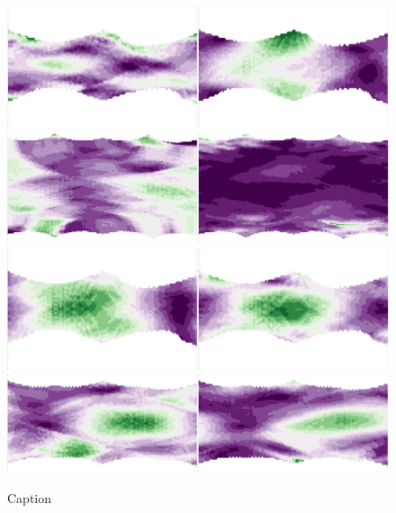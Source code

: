\begin{figure}
    \centering
    \includegraphics[width=\columnwidth]{images/RadonPlots/RT-snips/RPSB-9872-3701-RT-snip.png}
    \includegraphics[width=\columnwidth]{images/RadonPlots/RT-snips/RPSB-8932-12704-RT-snip.png}
    \includegraphics[width=\columnwidth]{images/RadonPlots/RT-snips/RPSB-8554-3701-RT-snip.png}
    \includegraphics[width=\columnwidth]{images/RadonPlots/RT-snips/RPSB-8323-6103-RT-snip.png}
    \caption{Caption}
    \label{fig:RPSB-RTs}
\end{figure}